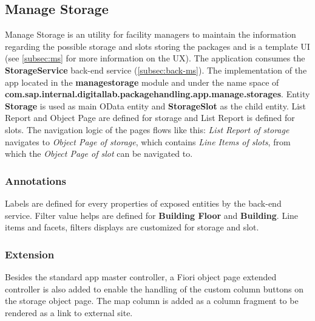 \subsection{Manage Storage}
\label{subsec:dev-ui-ms}

Manage Storage is an utility for facility managers to maintain the information regarding the possible storage and slots storing the packages and is a template UI (see \autoref{subsec:ms} for more information on the UX).
The application consumes the \textbf{StorageService} back-end service (\autoref{subsec:back-ms}).
The implementation of the app
located in the \textbf{managestorage} module and under the name space of
\textbf{com.sap.internal.digitallab.packagehandling.app.manage.storages}.
Entity \textbf{Storage} is used as main OData entity and \textbf{StorageSlot} as the child entity.
List Report and Object Page are defined for storage and List Report is defined for slots. The navigation logic of the pages flows like this: \textit{List Report of storage} navigates to \textit{Object Page of storage}, which contains \textit{Line Items of 
slots}, from which the \textit{Object Page of slot} can be navigated to.

\subsubsection{Annotations}
Labels are defined for every properties of exposed entities by the back-end service. Filter value helps are defined for \textbf{Building Floor} and \textbf{Building}.
Line items and facets, filters displays are customized for storage and slot.

\subsubsection{Extension}

Besides the standard app master controller, a Fiori object page extended controller is also added to enable the handling of the custom column buttons on the storage object page. The map column is added as a column fragment to be rendered as a link to external site.


